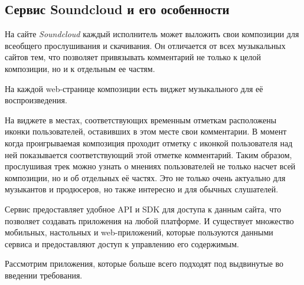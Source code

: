 \subsection{Сервис Soundcloud и его особенности}

На сайте {\itshape Soundcloud} каждый исполнитель
может выложить свои композиции для всеобщего прослушивания и
скачивания. Он отличается от всех музыкальных сайтов тем, что
позволяет привязывать комментарий не только к целой композиции, но и к
отдельным ее частям.

На каждой web-странице композиции есть виджет музыкального  для её
воспроизведения. 


На виджете в местах, соответствующих временным отметкам
расположены иконки пользователей, оставивших в этом месте
свои комментарии. В момент когда проигрываемая композиция проходит отметку
с иконкой пользователя над ней показывается соответствующий этой
отметке комментарий. Таким образом,
прослушивая трек можно узнать о мнениях пользователей не только насчет
всей композиции, но и об отдельных её частях. 
Это не только очень актуально для музыкантов и продюсеров, но также
интересно и для обычных слушателей.

Сервис предоставляет удобное API и SDK для доступа к данным сайта, что
позволяет создавать приложения на любой платформе. И существует
множество  мобильных, настольных и web-приложений, которые
пользуются данными сервиса и предоставляют доступ к управлению его содержимым.  

Рассмотрим приложения, которые больше всего подходят под выдвинутые во введении
требования.